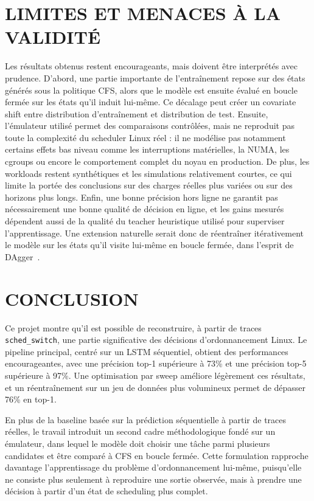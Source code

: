 \documentclass[letterpaper, 10 pt, conference]{ieeeconf}  %
\begin{document}
\section{LIMITES ET MENACES À LA VALIDITÉ}

Les résultats obtenus restent encourageants, mais doivent être interprétés avec prudence. D'abord, une partie importante de l'entraînement repose sur des états générés sous la politique CFS, alors que le modèle est ensuite évalué en boucle fermée sur les états qu'il induit lui-même. Ce décalage peut créer un covariate shift entre distribution d'entraînement et distribution de test. Ensuite, l'émulateur utilisé permet des comparaisons contrôlées, mais ne reproduit pas toute la complexité du scheduler Linux réel : il ne modélise pas notamment certains effets bas niveau comme les interruptions matérielles, la NUMA, les cgroups ou encore le comportement complet du noyau en production. De plus, les workloads restent synthétiques et les simulations relativement courtes, ce qui limite la portée des conclusions sur des charges réelles plus variées ou sur des horizons plus longs. Enfin, une bonne précision hors ligne ne garantit pas nécessairement une bonne qualité de décision en ligne, et les gains mesurés dépendent aussi de la qualité du teacher heuristique utilisé pour superviser l'apprentissage. Une extension naturelle serait donc de réentraîner itérativement le modèle sur les états qu'il visite lui-même en boucle fermée, dans l'esprit de DAgger~\cite{ross2011dagger}.


\section{CONCLUSION}

Ce projet montre qu'il est possible de reconstruire, à partir de traces \texttt{sched\_switch}, une partie significative des décisions d'ordonnancement Linux. Le pipeline principal, centré sur un LSTM séquentiel, obtient des performances encourageantes, avec une précision top-1 supérieure à 73\% et une précision top-5 supérieure à 97\%. Une optimisation par sweep améliore légèrement ces résultats, et un réentraînement sur un jeu de données plus volumineux permet de dépasser 76\% en top-1.

En plus de la baseline basée sur la prédiction séquentielle à partir de traces réelles, le travail introduit un second cadre méthodologique fondé sur un émulateur, dans lequel le modèle doit choisir une tâche parmi plusieurs candidates et être comparé à CFS en boucle fermée. Cette formulation rapproche davantage l'apprentissage du problème d’ordonnancement lui-même, puisqu'elle ne consiste plus seulement à reproduire une sortie observée, mais à prendre une décision à partir d'un état de scheduling plus complet.
\end{document}
